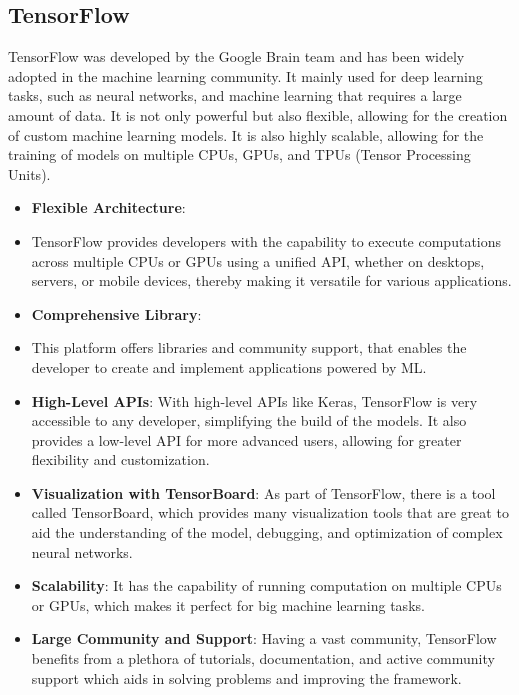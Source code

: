 \subsection{TensorFlow}

TensorFlow was developed by the Google Brain team and has been widely adopted in the machine learning community. It mainly used for deep learning tasks, such as neural networks, and machine
learning that requires a large amount of data. It is not only powerful but also flexible, allowing for the creation of custom machine learning models. It is also highly scalable, allowing for 
the training of models on multiple CPUs, GPUs, and TPUs (Tensor Processing Units).\cite{tensorflow}

\begin{itemize}
    \item \textbf{Flexible Architecture}: 
    \item TensorFlow provides developers with the capability to execute computations across multiple CPUs or GPUs using a unified API, whether on desktops, servers, or mobile devices, thereby making it versatile for various applications.
    \item \textbf{Comprehensive Library}: 
    \item This platform offers libraries and community support, that enables the developer to create and implement applications powered by ML.
    \item \textbf{High-Level APIs}: With high-level APIs like Keras, TensorFlow is very accessible to any developer, simplifying the build of the models. It also provides a low-level API for more advanced users, allowing for greater flexibility and customization.
    \item \textbf{Visualization with TensorBoard}: As part of TensorFlow, there is a tool called TensorBoard, which provides many visualization tools that are great to aid the understanding
    of the model, debugging, and optimization of complex neural networks.
    \item \textbf{Scalability}: It has the capability of running computation on multiple CPUs or GPUs, which makes it perfect for big machine learning tasks.
    \item \textbf{Large Community and Support}: Having a vast community, TensorFlow benefits from a plethora of tutorials, documentation, and active community support which aids in solving problems and improving the framework.
\end{itemize}

